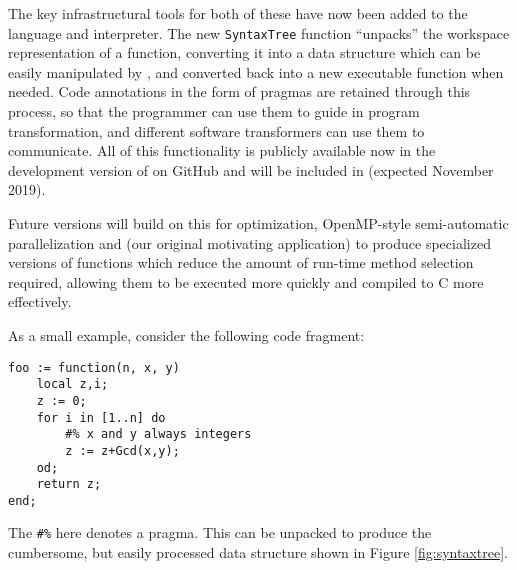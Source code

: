 The key infrastructural tools for both of these have now been added to
the \GAP language and interpreter. The new \verb|SyntaxTree| function
``unpacks'' the workspace representation of a \GAP function,
converting it into a data structure which can be easily manipulated by
\GAP, and converted back into a new executable \GAP function when
needed. Code annotations in the form of pragmas are retained through
this process, so that the programmer can use them to guide in
program transformation, and different software transformers can use
them to communicate. All of this functionality is publicly available
now in the development version of \GAP on GitHub and will be included
in  (expected November 2019).

Future versions will build on this for optimization, OpenMP-style
semi-automatic parallelization and (our original motivating
application) to produce specialized versions of functions which reduce
the amount of run-time method selection required, allowing them to be
executed more quickly and compiled to C more effectively.

As a small example, consider the following code fragment:


\begin{Small}
\begin{verbatim}
foo := function(n, x, y)
    local z,i;
    z := 0;
    for i in [1..n] do
        #% x and y always integers
        z := z+Gcd(x,y);
    od;
    return z;
end;
\end{verbatim}
\end{Small}

The \verb|#%| here denotes a pragma. This can be unpacked to produce
the cumbersome, but easily processed data structure shown in Figure \ref{fig:syntaxtree}.

